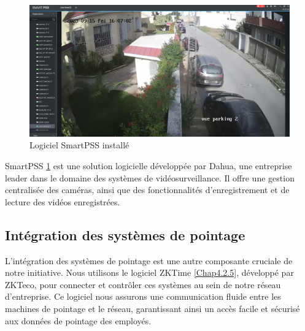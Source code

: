 \begin{figure}[H]
\centering
\includegraphics[width=15cm]{Images/SmartPSS1.png}
\caption{Logiciel SmartPSS installé}
\label{Chap4.2.4}
\end{figure}
\smallskip

SmartPSS \ref{Chap4.2.4} est une solution logicielle développée par Dahua, une entreprise leader dans le domaine des systèmes de vidéosurveillance. Il offre une gestion centralisée des caméras, ainsi que des fonctionnalités d'enregistrement et de lecture des vidéos enregistrées. 


\subsection{Intégration des systèmes de pointage}

L'intégration des systèmes de pointage est une autre composante cruciale de notre initiative. Nous utilisons le logiciel ZKTime \ref{Chap4.2.5}, développé par ZKTeco, pour connecter et contrôler ces systèmes au sein de notre réseau d'entreprise. Ce logiciel nous assurons une communication fluide entre les machines de pointage et le réseau, garantissant ainsi un accès facile et sécurisé aux données de pointage des employés.

